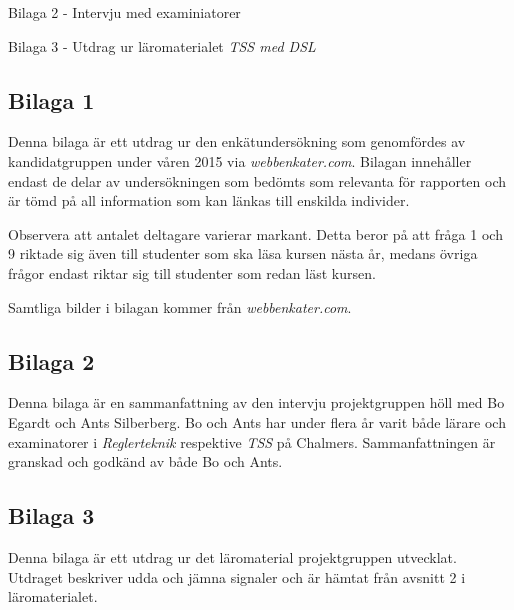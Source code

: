 \documentclass[]{article}
\begin{document}
Bilaga 2 - Intervju med examiniatorer

Bilaga 3 - Utdrag ur läromaterialet \textit{TSS med DSL}
\subsection{Bilaga 1}
Denna bilaga är ett utdrag ur den enkätundersökning som genomfördes av
kandidatgruppen under våren 2015 via \textit{webbenkater.com}. Bilagan
innehåller endast de delar av undersökningen som bedömts som relevanta
för rapporten och är tömd på all information som kan länkas till
enskilda individer.

Observera att antalet deltagare varierar markant. Detta beror på att
 fråga 1 och 9 riktade sig även till studenter som ska läsa kursen nästa
år, medans övriga frågor endast riktar sig till studenter som redan läst
kursen.



Samtliga bilder i bilagan kommer från
\textit{webbenkater.com}.
\newpage

\subsection{Bilaga 2}
\label{bil:exam_intervju}
Denna bilaga är en sammanfattning av den intervju projektgruppen höll
med Bo Egardt och Ants Silberberg. Bo och Ants har under flera år
varit både lärare och examinatorer i \textit{Reglerteknik} respektive
\textit{TSS} på Chalmers. Sammanfattningen är granskad och godkänd av
både Bo och Ants.
\newpage

\subsection{Bilaga 3}
Denna bilaga är ett utdrag ur det läromaterial projektgruppen
utvecklat. Utdraget beskriver udda och jämna signaler och är hämtat
från avsnitt 2 i läromaterialet.
\end{document}
